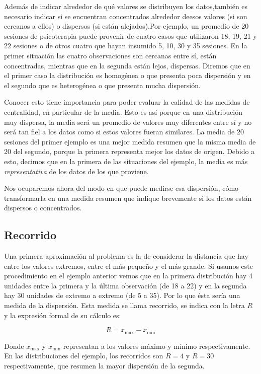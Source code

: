\documentclass[]{book}
\begin{document}
Además de indicar alrededor de qué valores se distribuyen los datos,también es necesario indicar si se encuentran concentrados alrededor deesos valores (si son cercanos a ellos) o dispersos (si están alejados).Por ejemplo, un promedio de 20 sesiones de psicoterapia puede provenir de cuatro casos que utilizaron 18, 19, 21 y 22 sesiones o de otros cuatro que hayan insumido 5, 10, 30 y 35 sesiones. En la primer situación las cuatro observaciones son cercanas entre sí, están concentradas, mientras que en la segunda están lejos, dispersas. Diremos que en el primer caso la distribución es homogénea o que presenta poca dispersión y en el segundo que es heterogénea o que presenta mucha dispersión.

Conocer esto tiene importancia para poder evaluar la calidad de las medidas de centralidad, en particular de la media. Esto es así porque en una distribución muy dispersa, la media será un promedio de valores muy diferentes entre sí y no será tan fiel a los datos como si estos valores fueran similares. La media de 20 sesiones del primer ejemplo es una mejor medida resumen que la misma media de 20 del segundo, porque la primera representa mejor los datos de origen. Debido a esto, decimos que en la primera de las situaciones del ejemplo, la media es más \emph{representativa} de los datos de los que proviene.

Nos ocuparemos ahora del modo en que puede medirse esa dispersión, cómo transformarla en una medida resumen que indique brevemente si los datos están dispersos o concentrados.

\hypertarget{recorrido}{%
\subsection{Recorrido}\label{recorrido}}

Una primera aproximación al problema es la de considerar la distancia que hay entre los valores extremos, entre el más pequeño y el más grande. Si usamos este procedimiento en el ejemplo anterior vemos que en la primera distribución hay 4 unidades entre la primera y la última observación (de 18 a 22) y en la segunda hay 30 unidades de extremo a extremo (de 5 a 35). Por lo que ésta sería una medida de la dispersión.
Esta medida se llama recorrido, se indica con la letra \(R\) y la expresión formal de su cálculo es:

\[R = x_{\max} - x_{\min}\]

Donde \(x_{\max}\) y \(x_{\min}\) representan a los valores máximo y mínimo
respectivamente. En las distribuciones del ejemplo, los recorridos son
\(R=4\) y \(R=30\) respectivamente, que resumen la mayor dispersión de la
segunda.
\end{document}
